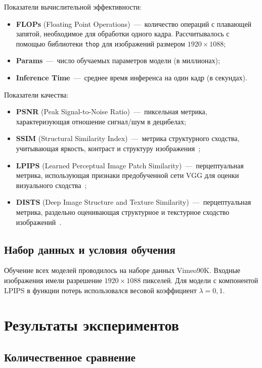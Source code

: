 Показатели вычислительной эффективности:
\begin{itemize}
	\item \textbf{FLOPs} (Floating Point Operations)~---~количество операций с плавающей запятой, необходимое для обработки одного кадра. Рассчитывалось с помощью библиотеки \texttt{thop} для изображений размером $1920 \times 1088$;
	\item \textbf{Params}~---~число обучаемых параметров модели (в миллионах);
	\item \textbf{Inference Time}~---~среднее время инференса на один кадр (в секундах).
\end{itemize}

Показатели качества:
\begin{itemize}
	\item \textbf{PSNR} (Peak Signal-to-Noise Ratio)~---~пиксельная метрика, характеризующая отношение сигнал/шум в децибелах;
	\item \textbf{SSIM} (Structural Similarity Index)~---~метрика структурного сходства, учитывающая яркость, контраст и структуру изображения~\cite{wang2004};
	\item \textbf{LPIPS} (Learned Perceptual Image Patch Similarity)~---~перцептуальная метрика, использующая признаки предобученной сети VGG для оценки визуального сходства~\cite{zhang2018};
	\item \textbf{DISTS} (Deep Image Structure and Texture Similarity)~---~перцептуальная метрика, раздельно оценивающая структурное и текстурное сходство изображений~\cite{ding2020}.
\end{itemize}

\subsection*{Набор данных и условия обучения}

Обучение всех моделей проводилось на наборе данных Vimeo90K. Входные изображения имели разрешение $1920 \times 1088$ пикселей. Для модели с компонентой LPIPS в функции потерь использовался весовой коэффициент $\lambda = 0{,}1$.

\section{Результаты экспериментов}

\subsection*{Количественное сравнение}

